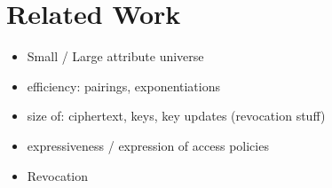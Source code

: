 \chapter{Related Work}

\begin{itemize}
    \item Small / Large attribute universe
    \item efficiency: pairings, exponentiations
    \item size of: ciphertext, keys, key updates (revocation stuff)
    \item expressiveness / expression of access policies
    \item Revocation
\end{itemize}